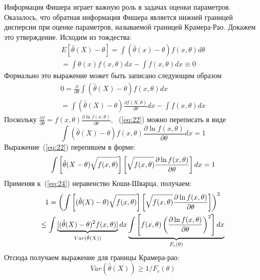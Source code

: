 Информация Фишера играет важную роль в задачах оценки параметров. 
Оказалось, что обратная информация Фишера является нижней границей дисперсии при оценке параметров, называемой границей Крамера-Рао.
Докажем это утверждение. 
%
Исходим из тождества:
%
\begin{multline}
    \label{eq:21}
        E[\hat{\theta}(X) - \theta] = 
            \int(\hat{\theta}(x) - \theta)f(x,\theta)d\theta \\ 
                = \int\theta(x)f(x,\theta)dx - \int f(x,\theta)dx \equiv 0 
\end{multline}
%
Формально это выражение может быть записано следующим образом
%
\begin{multline}
    \label{eq:22}
        0 = \frac{\partial}{\partial \theta}
            \int(\hat{\theta}(X) - \theta)f(x,\theta)dx \\
                = \int(\hat{\theta}(X) - \theta)
            \frac{\partial f(X, \theta)}{\partial \theta}dx - 
        \int f(x,\theta)dx   
\end{multline}
%
Поскольку $\frac{\partial f}{\partial \theta} = f(x,\theta) 
    \frac{\partial \ln f(x,\theta)}{\partial \theta}$, 
~(\ref{eq:22}) можно переписать в виде 
%
\begin{equation}
    \label{eq:23}
        \int(\hat{\theta}(X) - \theta)
            f(x,\theta) \frac{\partial \ln f(x,\theta)}
        {\partial \theta}dx = 1
\end{equation}
%
Выражение~(\ref{eq:22}) перепишем в форме: 
%
\begin{equation}
    \label{eq:24}
        \int \left[\hat{\theta}(X-\theta)\Large \sqrt{\mathstrut f(x,\theta)}\right]
            \left[\Large\sqrt{\mathstrut f(x,\theta)} 
                \frac{\partial \ln f(x,\theta)}{\partial \theta}\right]dx = 1
\end{equation}
%
Применяя к~(\ref{eq:24}) неравенство Коши-Шварца, получаем:
%
\begin{multline}
    \label{eq:25}
        1 = \left(\int \left[(\hat{\theta}(X)-\theta)
            \Large \sqrt{\mathstrut f(x,\theta)}\right]
                \left[\Large \sqrt{\mathstrut f(x,\theta)}
                    \frac{\partial \ln f(x,\theta)}{\partial \theta} \right]
                \right)^2 \\ 
                \leq \int 
            \underbrace{[(\hat{\theta}(X) - \theta)^2 f(x,\theta)]}_{Var(\hat{\theta}(X))}dx 
        \underbrace{\int\left[f(x,\theta)\left(\frac{\partial \ln f(x,\theta)}
    {\partial \theta}\right)^2 \right]dx}_{F_c(\theta)}
\end{multline}
%
Отсюда получаем выражение для границы Крамера-рао:
%
\begin{equation}
    \label{eq:26}
        Var(\hat{\theta}(X)) \geq 1/{F_c (\theta)}
\end{equation}




